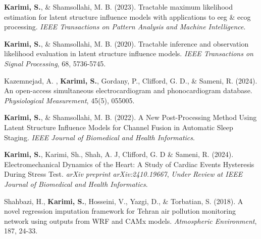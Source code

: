 \documentclass[
	10pt, %
]{FreemanCV}
\begin{document}
\begin{paracol}{2}

\textbf{Karimi, S.}, \& Shamsollahi, M. B. (2023). Tractable maximum likelihood estimation for latent structure influence models with applications to eeg \& ecog processing.  \textit{IEEE Transactions on Pattern Analysis and Machine Intelligence}.
\medskip %

\textbf{Karimi, S.}, \& Shamsollahi, M. B. (2020). Tractable inference and observation likelihood evaluation in latent structure influence models. \textit{IEEE Transactions on Signal Processing}, 68, 5736-5745.
\medskip %

Kazemnejad, A. , \textbf{Karimi, S.}, Gordany, P., Clifford, G. D., \& Sameni, R. (2024). An open-access simultaneous electrocardiogram and phonocardiogram database. \textit{Physiological Measurement}, 45(5), 055005.
\medskip %

\textbf{Karimi, S.}, \& Shamsollahi, M. B. (2022). A New Post-Processing Method Using Latent Structure Influence Models for Channel Fusion in Automatic Sleep Staging. \textit{IEEE Journal of Biomedical and Health Informatics}.
\medskip %

\textbf{Karimi, S.}, {Karimi, Sh.}, Shah, A. J, Clifford, G. D \& Sameni, R. (2024). Electromechanical Dynamics of the Heart: A Study of Cardiac Events Hysteresis During Stress Test. \textit{arXiv preprint arXiv:2410.19667}, \textit{Under Review at IEEE Journal of Biomedical and Health Informatics}.
\medskip %

Shahbazi, H., \textbf{Karimi, S.}, Hosseini, V., Yazgi, D., \& Torbatian, S. (2018). A novel regression imputation framework for Tehran air pollution monitoring network using outputs from WRF and CAMx models. \textit{Atmospheric Environment}, 187, 24-33.
\medskip %






\switchcolumn %



\end{paracol}
\end{document}
